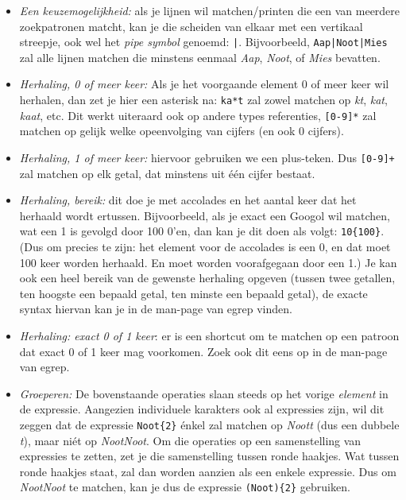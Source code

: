 \documentclass[a4paper,twoside,openany]{memoir}
\begin{document}
\begin{itemize}
  \item \emph{Een keuzemogelijkheid:} als je lijnen wil matchen/printen die een
    van meerdere zoekpatronen matcht, kan je die scheiden van elkaar met een
    vertikaal streepje, ook wel het \emph{pipe symbol} genoemd: \verb!|!.
    Bijvoorbeeld, \verb!Aap|Noot|Mies! zal alle lijnen matchen die minstens
    eenmaal \emph{Aap}, \emph{Noot}, of \emph{Mies} bevatten.

  \item \emph{Herhaling, 0 of meer keer:} Als je het voorgaande element 0 of
    meer keer wil herhalen, dan zet je hier een asterisk na: \verb!ka*t! zal
    zowel matchen op \emph{kt}, \emph{kat}, \emph{kaat}, etc. Dit werkt
    uiteraard ook op andere types referenties, \verb![0-9]*! zal matchen op
    gelijk welke opeenvolging van cijfers (en ook 0 cijfers).

  \item \emph{Herhaling, 1 of meer keer:} hiervoor gebruiken we een plus-teken.
    Dus \verb![0-9]+! zal matchen op elk getal, dat minstens uit \'e\'en cijfer
    bestaat.

  \item \emph{Herhaling, bereik:} dit doe je met accolades en het aantal keer
    dat het herhaald wordt ertussen. Bijvoorbeeld, als je exact een Googol wil
    matchen, wat een 1 is gevolgd door 100 0'en, dan kan je dit doen als volgt:
    \verb!10{100}!. (Dus om precies te zijn: het element voor de accolades is
    een 0, en dat moet 100 keer worden herhaald. En moet worden voorafgegaan
    door een 1.) Je kan ook een heel bereik van de gewenste herhaling
    opgeven (tussen twee getallen, ten hoogste een bepaald getal, ten
    minste een bepaald getal), de exacte
    syntax hiervan kan je in de man-page van egrep vinden.

  \item \emph{Herhaling: exact 0 of 1 keer}: er is een shortcut om te
    matchen op een patroon dat exact 0 of 1 keer mag voorkomen. Zoek
    ook dit eens op in de man-page van egrep.

  \item \emph{Groeperen:} De bovenstaande operaties slaan steeds op het vorige
    \emph{element} in de expressie. Aangezien individuele karakters ook al
    expressies zijn, wil dit zeggen dat de expressie \verb!Noot{2}! \'enkel zal
    matchen op \emph{Noott} (dus een dubbele \emph{t}), maar ni\'et op
    \emph{NootNoot}. Om die operaties op een samenstelling van expressies te
    zetten, zet je die samenstelling tussen ronde haakjes. Wat tussen ronde
    haakjes staat, zal dan worden aanzien als een enkele expressie. Dus om
    \emph{NootNoot} te matchen, kan je dus de expressie \verb!(Noot){2}!
    gebruiken.


\end{itemize}
\end{document}
